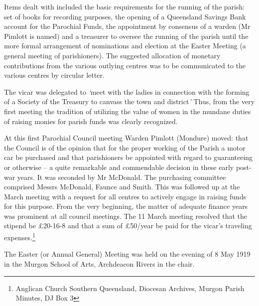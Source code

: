 Items dealt with included the basic requirements for the running of the
parish: set of books for recording purposes, the opening of a Queensland
Savings Bank account for the Parochial Funds, the appointment by
consensus of a warden (Mr Pimlott is named) and a treasurer to oversee
the running of the parish until the more formal arrangement of
nominations and election at the Easter Meeting (a general meeting of
parishioners). The suggested allocation of monetary contributions from
the various outlying centres was to be communicated to the various
centres by circular letter.

The vicar was delegated to \emph{`}meet with the ladies in connection
with the forming of a Society of the Treasury to canvass the town and
district\emph{'} Thus, from the very first meeting the tradition of
utilizing the value of women in the mundane duties of raising monies for
parish funds was clearly recognized.

At this first Parochial Council meeting Warden Pimlott (Mondure) moved:
that the Council is of the opinion that for the proper working of the
Parish a motor car be purchased and that parishioners be appointed with
regard to guaranteeing or otherwise -- a quite remarkable and
commendable decision in these early post-war years. It was seconded by
Mr McDonald. The purchasing committee comprised Messrs McDonald, Faunce
and Smith. This was followed up at the March meeting with a request for
all centres to actively engage in raising funds for this purpose. From
the very beginning, the matter of adequate finance years was prominent
at all council meetings. The 11 March meeting resolved that the stipend
be \pounds20-16-8 and that a sum of \pounds50/year be paid for the vicar's traveling
expenses.\footnote{Anglican Church Southern Queensland, Diocesan
  Archives, Murgon Parish Minutes, DJ Box 3}

The Easter (or Annual General) Meeting was held on the evening of 8 May
1919 in the Murgon School of Arts, Archdeacon Rivers in the chair.

